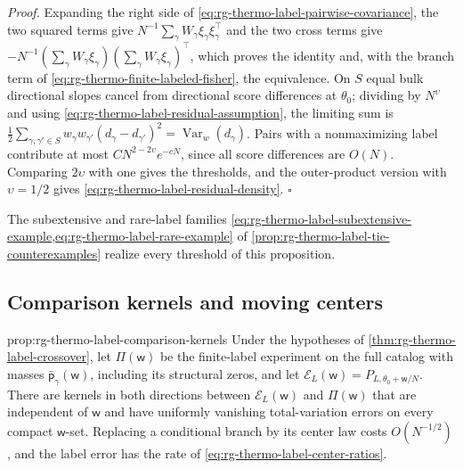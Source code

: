 \noindent\emph{Proof.}
Expanding the right side of \cref{eq:rg-thermo-label-pairwise-covariance},
the two squared terms give $N^{-1}\sum_\gamma W_\gamma\xi_\gamma\xi_\gamma^\top$
and the two cross terms give
$-N^{-1}(\sum_\gamma W_\gamma\xi_\gamma)(\sum_\gamma W_\gamma\xi_\gamma)^\top$,
which proves the identity and, with the branch term of
\cref{eq:rg-thermo-finite-labeled-fisher}, the equivalence. On $S$ equal bulk
directional slopes cancel from directional score differences at $\theta_0$;
dividing by $N^\upsilon$ and using
\cref{eq:rg-thermo-label-residual-assumption}, the limiting sum is
$\frac12\sum_{\gamma,\gamma'\in S}w_\gamma w_{\gamma'}(d_\gamma-d_{\gamma'})^2
=\operatorname{Var}_w(d_\gamma)$. Pairs with a nonmaximizing label contribute
at most $CN^{2-2\upsilon}e^{-cN}$, since all score differences are $O(N)$.
Comparing $2\upsilon$ with one gives the thresholds, and the outer-product
version with $\upsilon=1/2$ gives \cref{eq:rg-thermo-label-residual-density}.
$\square$

The subextensive and rare-label families
\cref{eq:rg-thermo-label-subextensive-example,eq:rg-thermo-label-rare-example}
of \cref{prop:rg-thermo-label-tie-counterexamples} realize every threshold of
this proposition.

\subsection{Comparison kernels and moving centers}
\label{sec:rg-thermo-label-crossover}

{prop:rg-thermo-label-comparison-kernels}
Under the hypotheses of \cref{thm:rg-thermo-label-crossover}, let
$\Pi(\mathsf w)$ be the finite-label experiment on the full catalog with
masses $\bar{\mathsf p}_\gamma(\mathsf w)$, including its structural zeros,
and let $\mathcal E_L(\mathsf w)=P_{L,\theta_0+\mathsf w/N}$. There are kernels
in both directions between $\mathcal E_L(\mathsf w)$ and $\Pi(\mathsf w)$ that
are independent of $\mathsf w$ and have uniformly vanishing total-variation
errors on every compact $\mathsf w$-set. Replacing a conditional branch by its
center law costs $O(N^{-1/2})$, and the label error has the rate of
\cref{eq:rg-thermo-label-center-ratios}. 

